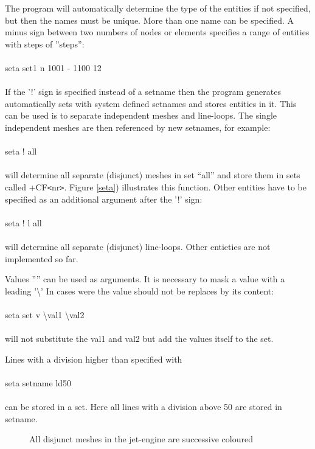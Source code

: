 \documentclass{article}
\begin{document}
The program will automatically determine the type of the entities if not specified, but then the names must be unique. More than one name can be specified. A minus sign between two numbers of nodes or elements specifies a range of entities with steps of ''steps'':\\\\seta set1 n 1001 - 1100 12\\\\

If the '!' sign is specified instead of a setname then the program generates automatically sets with system defined setnames and stores entities in it. This can be used is to separate independent meshes and line-loops. The single independent meshes are then referenced by new setnames, for example:\\\\seta ! all\\\\will determine all separate (disjunct) meshes in set ``all'' and store them in sets called +CF\verb_<_nr\verb_>_. Figure \ref{seta}) illustrates this function. Other entities have to be specified as an additional argument after the '!' sign:\\\\seta ! l all\\\\will determine all separate (disjunct) line-loops. Other entieties are not implemented so far. 

Values '''' can be used as arguments. It is necessary to mask a value with a leading '\textbackslash{}' In cases were the value should not be replaces by its content:\\\\seta set v \textbackslash{}val1 \textbackslash{}val2\\\\will not substitute the val1 and val2 but add the values itself to the set.

Lines with a division higher than specified with\\\\
seta setname ld50\\\\
can be stored in a set. Here all lines with a division above 50 are stored in setname. 

  
\begin{figure}[h]
\caption{\label{engine}All disjunct meshes in the jet-engine are successive coloured}
\end{figure}
\end{document}
